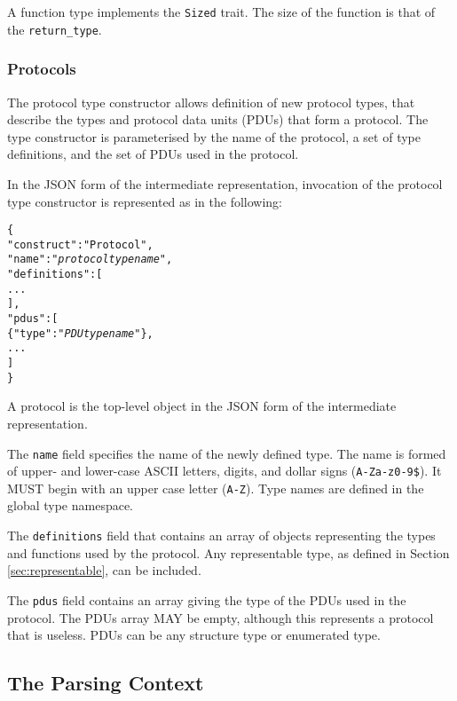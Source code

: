 \documentclass[10pt,twocolumn,a4paper]{article}
\newcommand{\code}[1]{\texttt{#1}}
\begin{document}
A function type implements the \code{Sized} trait. The size of the function is that of the
\code{return\_type}.

\subsubsection{Protocols}

The protocol type constructor allows definition of new protocol types, that
describe the types and protocol data units (PDUs) that form a protocol. The
type constructor is parameterised by the name of the protocol, a set of
type definitions, and the set of PDUs used in the protocol.

In the JSON form of the intermediate representation, invocation of the
protocol type constructor is represented as in the following:
\footnotesize
\begin{alltt}
  \{
    "construct"   : "Protocol",
    "name"        : "\emph{protocol type name}",
    "definitions" : [
                      ...
                    ],
    "pdus"        : [
      \{"type" : "\emph{PDU type name}"\},
      ...
    ]
  \}
\end{alltt}
\normalsize
A protocol is the top-level object in the JSON form of the intermediate
representation.

The \code{name} field specifies the name of the newly defined type. The
name is formed of upper- and lower-case ASCII letters, digits, and dollar
signs (\code{A-Za-z0-9\$}).  It MUST begin with an upper case letter
(\code{A-Z}). Type names are defined in the global type namespace.

The \code{definitions} field that contains an array of objects representing
the types and functions used by the protocol. Any representable type, as
defined in Section \ref{sec:representable}, can be included.

The \code{pdus} field contains an array giving the type of the PDUs used
in the protocol. The PDUs array MAY be empty, although this represents a
protocol that is useless. PDUs can be any structure type or enumerated
type. 

\subsection{The Parsing Context}
\label{sec:context}
\end{document}
